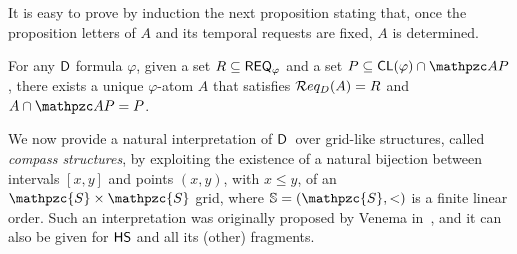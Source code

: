 It is easy to prove by induction the next proposition stating that, once the proposition letters of $A$ and its temporal requests are fixed, $A$ is determined.
\begin{proposition}\label{prop:unique}
    For any $\mathsf{D}$ formula $\varphi$,
    given a set $R \subseteq \mathsf{REQ}_{\varphi}$ and a set $P \subseteq \CL(\varphi)\cap \AP$, there exists a unique $\varphi$-atom $A$ that satisfies $\mathcal{R} eq_D(A)=R$ and $A\cap \AP = P$.
\end{proposition} 

We now provide a natural interpretation of $\mathsf{D}$\ over grid-like
structures, called \emph{compass structures}, by exploiting the existence
of a natural bijection between intervals $[x,y]$ and 
points $(x,y)$, with $x \leq y$, of an $\mathpzc{S}\times \mathpzc{S}$ grid, where $\mathbb{S} = (\mathpzc{S},<)$ is a finite linear order. Such an interpretation was originally proposed by Venema in~\cite{venema1990},
and it can also be given for $\text{\sffamily HS}$ and all its (other) fragments.



